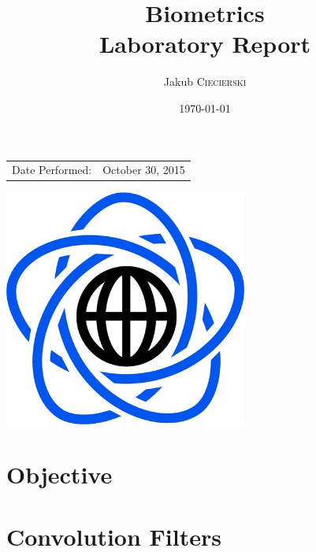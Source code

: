 \documentclass{article}
\title{Biometrics \\ Laboratory Report} %
\author{Jakub \textsc{Ciecierski}} %
\date{\today} %
\begin{document}
\maketitle %

\begin{center}
\begin{tabular}{l r}
Date Performed: & October 30, 2015 \\ %
\end{tabular}

\vspace{60pt}
\includegraphics[width=80mm]{res/mini.PNG} \\
\end{center}


\newpage

	\tableofcontents
	
\newpage



\section{Objective}



\section{Convolution Filters} \label{sec:conv}
\end{document}
